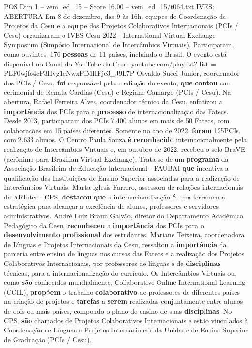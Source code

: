 \begin{textsample}{POS Dim 1 – vem\_ed\_15 – Score 16.00 – vem\_ed\_15/t064.txt}  \label{ex:f1_pos_098}
IVES: ABERTURA Em 8 de dezembro, das 9 às 16h, equipes de Coordenação de Projetos da Cesu e a equipe dos Projetos Colaborativos Internacionais (PCIs / Cesu) organizaram o IVES Cesu 2022 - International Virtual Exchange Symposium (Simpósio Internacional de Intercâmbios Virtuais).
Participaram, como ouvintes, 176 \textbf{pessoas} de 11 países, incluindo o Brasil.
O evento está disponível no Canal do YouTube da Cesu: youtube.com/playlist? list = PLF0wjfo4cP3Hvg1eNwxPiMHFje3\_J9L7P Osvaldo Succi Junior, coordenador dos PCIs / Cesu, \textbf{foi} responsável pela mediação do evento, \textbf{que} \textbf{contou} com cerimonial de Renata Cardias (Cesu) e Regiane Camargo (PCIs / Cesu).
Na abertura, Rafael Ferreira Alves, coordenador técnico da Cesu, enfatizou a \textbf{importância} dos PCIs para o \textbf{processo} de internacionalização das Fatecs.
Desde 2013, participaram dos PCIs 7.400 alunos em mais de 50 Fatecs, com colaborações em 15 países diferentes.
Somente no ano de 2022, \textbf{foram} 125PCIs, com 2.633 alunos.
O Centro Paula Souza \textbf{é} \textbf{reconhecido} internacionalmente pela realização de Intercâmbios Virtuais e, em outubro de 2022, recebeu o selo BraVE (acrônimo para Brazilian Virtual Exchange).
Trata-se de um \textbf{programa} da Associação Brasileira de Educação Internacional - FAUBAI \textbf{que} incentiva a qualificação das Instituições de Ensino Superior associadas para a realização de Intercâmbios Virtuais.
Marta Iglesis Farrero, assessora de relações internacionais da ARInter - CPS, \textbf{destacou} \textbf{que} a internacionalização \textbf{é} uma ferramenta estratégica para alcançar a excelência de alunos, professores e servidores administrativos.
André Luiz Braun Galvão, diretor do Departamento Acadêmico Pedagógico da Cesu, \textbf{reconheceu} a \textbf{importância} dos PCIs para o \textbf{desenvolvimento} \textbf{profissional} dos estudantes.
Mariane Teixeira, coordenadora de Línguas e Projetos Internacionais da Cesu, ressaltou a \textbf{importância} da parceria entre ensino de línguas nos cursos das Fatecs e a realização dos Projetos Colaborativos Internacionais, por professores de línguas e de \textbf{disciplinas} técnicas, para a internacionalização do currículo.
Os Intercâmbios Virtuais ou, como \textbf{são} conhecidos mundialmente, Collaborative Online International Learning (COIL), \textbf{propõem} o trabalho \textbf{colaborativo} de professores de diferentes países na criação de projetos e \textbf{tarefas} a \textbf{serem} realizadas conjuntamente entre alunos de dois ou mais países, compondo o plano de ensino de suas \textbf{disciplinas}.
No CPS, \textbf{são} chamados de Projetos Colaborativos Internacionais e estão vinculados à Coordenação de Línguas e Projetos Internacionais da Unidade de Ensino Superior de Graduação (PCIs / Cesu).

\end{textsample}
